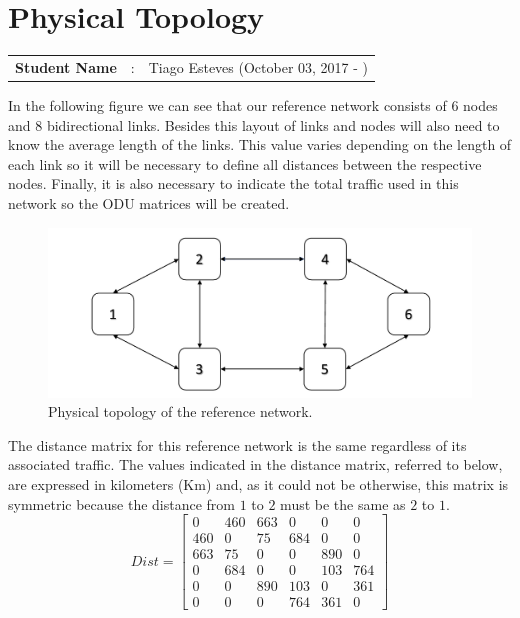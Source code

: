 \clearpage

\section{Physical Topology}\label{Reference_Network_Topology}
\begin{tcolorbox}	
\begin{tabular}{p{2.75cm} p{0.2cm} p{10.5cm}} 	
\textbf{Student Name}  &:& Tiago Esteves    (October 03, 2017 - )\\
\end{tabular}
\end{tcolorbox}
\vspace{11pt}

In the following figure we can see that our reference network consists of 6 nodes and 8 bidirectional links.
Besides this layout of links and nodes will also need to know the average length of the links.
This value varies depending on the length of each link so it will be necessary to define all distances between the respective nodes.
Finally, it is also necessary to indicate the total traffic used in this network so the ODU matrices will be created.\\

\begin{figure}[h!]
\centering
\includegraphics[width=\textwidth]{sdf/reference_network/figures/RedeTeste}
\caption{Physical topology of the reference network.}
\end{figure}

\vspace{11pt}
The distance matrix for this reference network is the same regardless of its associated traffic.
The values indicated in the distance matrix, referred to below, are expressed in kilometers (Km) and, as it could not be otherwise, this matrix is symmetric because the distance from $1$ to $2$ must be the same as $2$ to $1$.\\

\[
Dist=
  \begin{bmatrix}
    0 & 460 & 663 & 0 & 0 & 0 \\
    460 & 0 & 75 & 684 & 0 & 0 \\
    663 & 75 & 0 & 0 & 890 & 0 \\
    0 & 684 & 0 & 0 & 103 & 764 \\
    0 & 0 & 890 & 103 & 0 & 361 \\
    0 & 0 & 0 & 764 & 361 & 0
  \end{bmatrix}
\]

